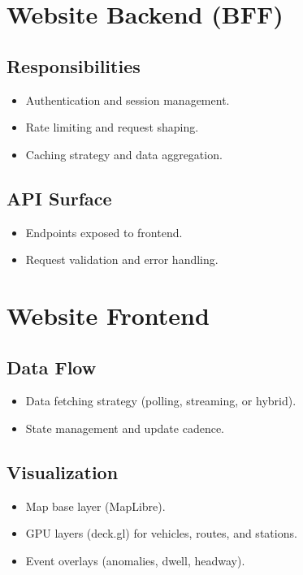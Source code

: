 \documentclass[12pt, a4paper]{article}
\begin{document}
\section{Website Backend (BFF)}
\subsection{Responsibilities}
\begin{itemize}[leftmargin=*]
    \item Authentication and session management.
    \item Rate limiting and request shaping.
    \item Caching strategy and data aggregation.
\end{itemize}

\subsection{API Surface}
\begin{itemize}[leftmargin=*]
    \item Endpoints exposed to frontend.
    \item Request validation and error handling.
\end{itemize}

\section{Website Frontend}
\subsection{Data Flow}
\begin{itemize}[leftmargin=*]
    \item Data fetching strategy (polling, streaming, or hybrid).
    \item State management and update cadence.
\end{itemize}

\subsection{Visualization}
\begin{itemize}[leftmargin=*]
    \item Map base layer (MapLibre).
    \item GPU layers (deck.gl) for vehicles, routes, and stations.
    \item Event overlays (anomalies, dwell, headway).
\end{itemize}
\end{document}
